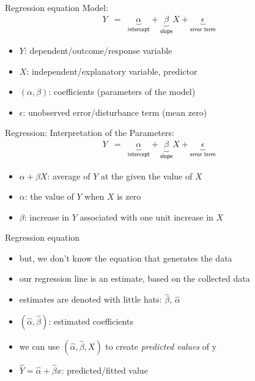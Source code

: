 \documentclass[presentation]{beamer}
\begin{document}
\begin{frame}[label={sec:orgfe50047}]{Regression equation}
Model:
\begin{eqnarray*}
    Y & = & \underbrace{\alpha}_{\textsf{intercept}} +
            \underbrace{\beta}_{\textsf{slope}}  X +
            \underbrace{\epsilon}_{\textsf{error term}} \label{eq:linear.model}
  \end{eqnarray*}

\begin{itemize}
\item \(Y\): dependent/outcome/response variable
\item \(X\): independent/explanatory variable, predictor
\item \((\alpha, \beta)\): coefficients (parameters of the model)
\item \(\epsilon\): unobserved error/disturbance term (mean zero)
\end{itemize}
\end{frame}

\begin{frame}[label={sec:orgd65759e}]{Regression: Interpretation of the Parameters:}
\begin{eqnarray*}
      Y & = & \underbrace{\alpha}_{\textsf{intercept}} +
              \underbrace{\beta}_{\textsf{slope}}  X +
              \underbrace{\epsilon}_{\textsf{error term}} \label{eq:linear.model}
\end{eqnarray*}

\begin{itemize}
\item \(\alpha + \beta X\): average of \(Y\) at the given the value of \(X\)
\item \(\alpha\): the value of \(Y\) when \(X\) is zero
\item \(\beta\): increase in \(Y\) associated with one unit increase in \(X\)
\end{itemize}
\end{frame}


\begin{frame}[label={sec:org74c3e03}]{Regression equation}
\begin{itemize}
\item but, we don't know the equation that generates the data
\item our regression line is an estimate, based on the collected data
\end{itemize}

\pause

\begin{itemize}
\item estimates are denoted with little hats: \(\hat{\beta}\), \(\hat{\alpha}\)
\item \((\hat\alpha, \hat\beta)\): estimated coefficients
\end{itemize}

\pause
\begin{itemize}
\item we can use \((\hat\alpha, \hat\beta, X)\) to create \emph{predicted values} of y
\item \(\widehat{Y} = \hat\alpha + \hat\beta x\): predicted/fitted value
\end{itemize}
\end{frame}
\end{document}
